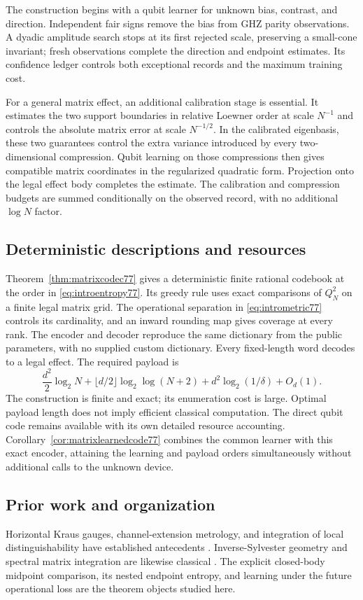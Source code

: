 The construction begins with a qubit learner for unknown bias,
contrast, and direction. Independent fair signs remove the bias from
GHZ parity observations. A dyadic amplitude search stops at its first
rejected scale, preserving a small-cone invariant; fresh observations
complete the direction and endpoint estimates. Its confidence ledger
controls both exceptional records and the maximum training cost.

For a general matrix effect, an additional calibration stage is
essential. It estimates the two support boundaries in relative
Loewner order at scale $N^{-1}$ and controls the absolute matrix error
at scale $N^{-1/2}$. In the calibrated eigenbasis, these two guarantees
control the extra variance introduced by every two-dimensional
compression. Qubit learning on those compressions then gives
compatible matrix coordinates in the regularized quadratic form.
Projection onto the legal effect body completes the estimate. The
calibration and compression budgets are summed conditionally on the
observed record, with no additional $\log N$ factor.

\subsection{Deterministic descriptions and resources}
Theorem~\ref{thm:matrixcodec77} gives a deterministic finite rational
codebook at the order in \eqref{eq:introentropy77}. Its greedy rule
uses exact comparisons of $Q_N^2$ on a finite legal matrix grid.
The operational separation in \eqref{eq:intrometric77} controls its
cardinality, and an inward rounding map gives coverage at every rank.
The encoder and decoder reproduce the same dictionary from the public
parameters, with no supplied custom dictionary. Every fixed-length
word decodes to a legal effect. The required payload is
\[
 \frac{d^2}{2}\log_2N+
 \lfloor d/2\rfloor\log_2\log(N+2)
             +d^2\log_2(1/\delta)+O_d(1).
\]
The construction is finite and exact; its enumeration cost is large.
Optimal payload length does not imply efficient classical computation.
The direct qubit code remains available with its own detailed resource
accounting. Corollary~\ref{cor:matrixlearnedcode77} combines the common
learner with this exact encoder, attaining the learning and payload
orders simultaneously without additional calls to the unknown device.

\subsection{Prior work and organization}
Horizontal Kraus gauges, channel-extension metrology, and integration
of local distinguishability have established antecedents
\cite{FI76,DKG67,DM76,KGAD76,YF76,SD76}.
Inverse-Sylvester geometry and spectral matrix integration are likewise
classical \cite{Dittmann76,SZGeom76}. The explicit closed-body
midpoint comparison, its nested endpoint entropy, and learning under
the future operational loss are the theorem objects studied here.

